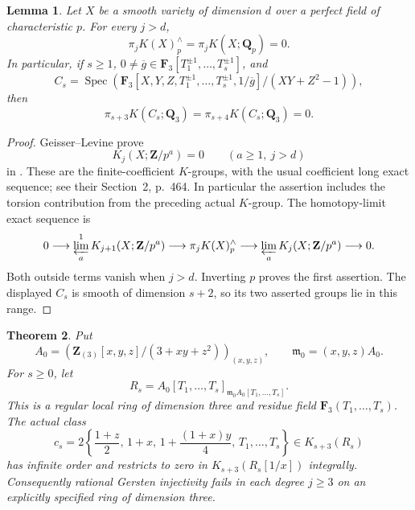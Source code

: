 \documentclass[11pt,a4paper]{amsart}
\numberwithin{equation}{section}
\newtheorem{theorem}{Theorem}[section]
\newtheorem{lemma}[theorem]{Lemma}
\theoremstyle{definition}
\theoremstyle{remark}
\newcommand{\Q}{\mathbf Q}
\newcommand{\Z}{\mathbf Z}
\newcommand{\F}{\mathbf F}
\newcommand{\Spec}{\operatorname{Spec}}
\begin{document}
\begin{lemma}
\label{d3:lem:laurentspecialvanishing}
Let $X$ be a smooth variety of dimension $d$ over a perfect field
of characteristic $p$. For every $j>d$,
\[
 \pi_jK(X)^{\wedge}_p=\pi_jK(X;\Q_p)=0.
\]
In particular, if $s\geq1$, $0\ne\overline g\in
\F_3[T_1^{\pm1},\ldots,T_s^{\pm1}]$, and
\[
 C_s=\Spec\!\left(
 \F_3[X,Y,Z,T_1^{\pm1},\ldots,T_s^{\pm1},1/\overline g]
                         /(XY+Z^2-1)\right),
\]
then
\[
 \pi_{s+3}K(C_s;\Q_3)=\pi_{s+4}K(C_s;\Q_3)=0.
\]
\end{lemma}
\begin{proof}
Geisser--Levine prove
\[
 K_j(X;\Z/p^a)=0\qquad(a\geq1,\ j>d)
\]
in \cite[Theorem~8.4, p.~491]{GeisserLevineCharP}.
These are the finite-coefficient $K$-groups, with the usual
coefficient long exact sequence; see their Section~2, p.~464.
In particular the assertion includes the torsion contribution
from the preceding actual $K$-group.
The homotopy-limit exact sequence is
\[
 0\longrightarrow\varprojlim_a^{1}K_{j+1}(X;\Z/p^a)
 \longrightarrow\pi_jK(X)^{\wedge}_p
 \longrightarrow\varprojlim_a K_j(X;\Z/p^a)
 \longrightarrow0.
\]
Both outside terms vanish when $j>d$. Inverting $p$ proves the
first assertion. The displayed $C_s$ is smooth of dimension
$s+2$, so its two asserted groups lie in this range.
\end{proof}


\begin{theorem}
\label{d3:thm:everydegreelaurent}
Put
\[
 A_0=\left(\Z_{(3)}[x,y,z]/(3+xy+z^2)\right)_{(x,y,z)},
 \qquad \mathfrak m_0=(x,y,z)A_0.
\]
For $s\geq0$, let
\[
 R_s=A_0[T_1,\ldots,T_s]_{\mathfrak m_0A_0[T_1,\ldots,T_s]}.
\]
This is a regular local ring of dimension three and residue field
$\F_3(T_1,\ldots,T_s)$. The actual class
\[
 c_s=2\left\{\frac{1+z}{2},\,1+x,\,
       1+\frac{(1+x)y}{4},\,T_1,\ldots,T_s\right\}
                    \in K_{s+3}(R_s)
\]
has infinite order and restricts to zero in $K_{s+3}(R_s[1/x])$
integrally. Consequently rational Gersten injectivity fails in
each degree $j\geq3$ on an explicitly specified ring of dimension
three.
\end{theorem}
\end{document}
